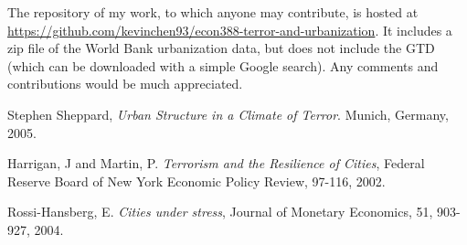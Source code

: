 \documentclass[preprint,2p,12pt]{elsarticle}
\begin{document}
The repository of my work, to which anyone may contribute, is hosted at \href{https://github.com/kevinchen93/econ388-terror-and-urbanization}{https://github.com/kevinchen93/econ388-terror-and-urbanization}. It includes a zip file of the World Bank urbanization data, but does not include the GTD (which can be downloaded with a simple Google search). Any comments and contributions would be much appreciated.


\begin{thebibliography}{9}

  Stephen Sheppard,
  \emph{Urban Structure in a Climate of Terror}.
  Munich, Germany,
  2005.

  Harrigan, J and Martin, P.
  \emph{Terrorism and the Resilience of Cities},
  Federal Reserve Board of New York Economic Policy Review,
  97-116,
  2002.

  Rossi-Hansberg, E.
  \emph{Cities under stress},
  Journal of Monetary Economics,
  51, 903-927,
  2004.

\end{thebibliography}
\end{document}
